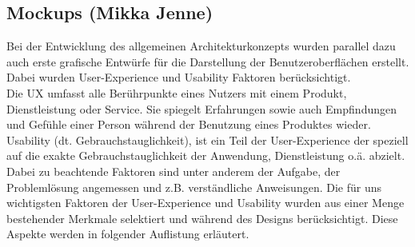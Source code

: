 \subsection{Mockups (Mikka Jenne)}
Bei der Entwicklung des allgemeinen Architekturkonzepts wurden parallel dazu auch erste grafische Entwürfe für die Darstellung der Benutzeroberflächen erstellt.
Dabei wurden User-Experience und Usability Faktoren berücksichtigt. \cite{gruenderszene.2020m}
\\
Die \ac{UX} umfasst alle Berührpunkte eines Nutzers mit einem Produkt, 
Dienstleistung oder Service. Sie spiegelt Erfahrungen sowie auch Empfindungen und Gefühle einer Person während der Benutzung eines Produktes wieder. \cite{foliensatz.2020m}
\\Usability (dt. Gebrauchstauglichkeit), ist ein Teil der User-Experience der speziell auf die exakte Gebrauchstauglichkeit der Anwendung, Dienstleistung
o.ä. abzielt. Dabei zu beachtende Faktoren sind unter anderem der Aufgabe, der Problemlösung angemessen und z.B. verständliche Anweisungen. 
\linebreak
Die für uns wichtigsten Faktoren der User-Experience und Usability wurden aus einer Menge bestehender Merkmale selektiert und während des Designs berücksichtigt. Diese Aspekte werden in
folgender Auflistung erläutert. \cite{degruyter.2020m}
\\
\linebreak
